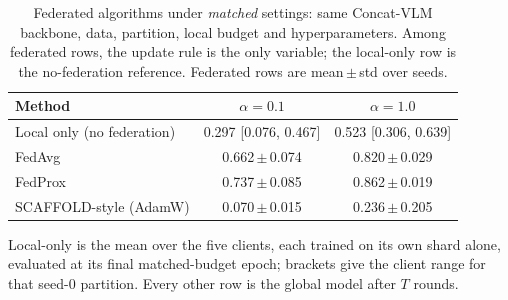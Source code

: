 \begin{table}[t]
\caption{Federated algorithms under \emph{matched} settings: same
Concat-VLM backbone, data, partition, local budget and hyperparameters.
Among federated rows, the update rule is the only variable; the local-only
row is the no-federation reference. Federated rows are
mean\,$\pm$\,std over seeds.}
\label{tab:baselines}
\centering\footnotesize
\setlength\tabcolsep{5pt}
\begin{tabular}{lcc}
\toprule
\textbf{Method} & $\alpha=0.1$ & $\alpha=1.0$\\
\midrule
Local only (no federation) & 0.297 [0.076, 0.467] & 0.523 [0.306, 0.639] \\
FedAvg & 0.662\,$\pm$\,0.074 & 0.820\,$\pm$\,0.029 \\
FedProx & 0.737\,$\pm$\,0.085 & 0.862\,$\pm$\,0.019 \\
SCAFFOLD-style (AdamW) & 0.070\,$\pm$\,0.015 & 0.236\,$\pm$\,0.205 \\
\bottomrule
\end{tabular}
\vspace{1pt}

{\scriptsize Local-only is the mean over the five clients, each trained on its
own shard alone, evaluated at its final matched-budget epoch; brackets give
the client range for that seed-0 partition. Every other
row is the global model after $T$ rounds.}
\end{table}
